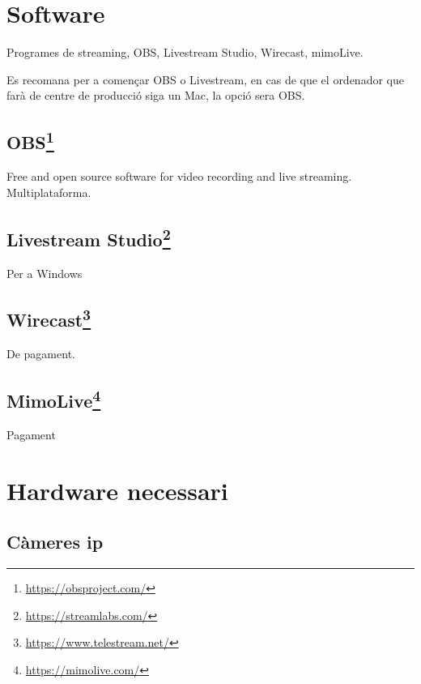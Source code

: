 \documentclass[
  10pt,
]{book}
\DeclareRobustCommand{\href}[2]{#2\footnote{\url{#1}}}
\begin{document}
\hypertarget{software}{%
\section{Software}\label{software}}

Programes de streaming, OBS, Livestream Studio, Wirecast, mimoLive.

Es recomana per a començar OBS o Livestream, en cas de que el ordenador que farà de centre de producció siga un Mac, la opció sera OBS.

\hypertarget{obs}{%
\subsection{\texorpdfstring{\href{https://obsproject.com/}{OBS}}{OBS}}\label{obs}}

Free and open source software for video recording and live streaming.
Multiplataforma.

\hypertarget{livestream-studio}{%
\subsection{\texorpdfstring{\href{https://streamlabs.com/}{Livestream Studio}}{Livestream Studio}}\label{livestream-studio}}

Per a Windows

\hypertarget{wirecast}{%
\subsection{\texorpdfstring{\href{https://www.telestream.net/}{Wirecast}}{Wirecast}}\label{wirecast}}

De pagament.

\hypertarget{mimolive}{%
\subsection{\texorpdfstring{\href{https://mimolive.com/}{MimoLive}}{MimoLive}}\label{mimolive}}

Pagament

\hypertarget{hardware-necessari}{%
\section{Hardware necessari}\label{hardware-necessari}}

\hypertarget{cuxe0meres-ip}{%
\subsection{Càmeres ip}\label{cuxe0meres-ip}}
\end{document}
